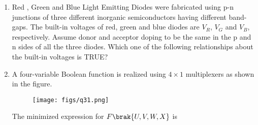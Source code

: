 \documentclass[a4paper, 11pt]{article}
\begin{document}
\begin{enumerate}
    \hfill{}

    \item Red , Green  and Blue  Light Emitting Diodes  were fabricated using p-n junctions of three different inorganic semiconductors having different band-gaps. The built-in voltages of red, green and blue diodes are $V_R$, $V_G$ and $V_B$, respectively. Assume donor and acceptor doping to be the same  in the p and n sides of all the three diodes.
    Which one of the following relationships about the built-in voltages is TRUE?
    \begin{enumerate}
    \end{enumerate}

    \hfill{}

    \item A four-variable Boolean function is realized using $4 \times 1$ multiplexers as shown in the figure.
    \begin{figure}[H]
        \centering
        \texttt{[image: figs/q31.png]}
        \caption*{}
        \label{fig:q31}
    \end{figure}
    The minimized expression for $F\brak{U,V,W,X}$ is
    \begin{enumerate}
    \end{enumerate}
    
    \hfill{}


\end{enumerate}
\end{document}
